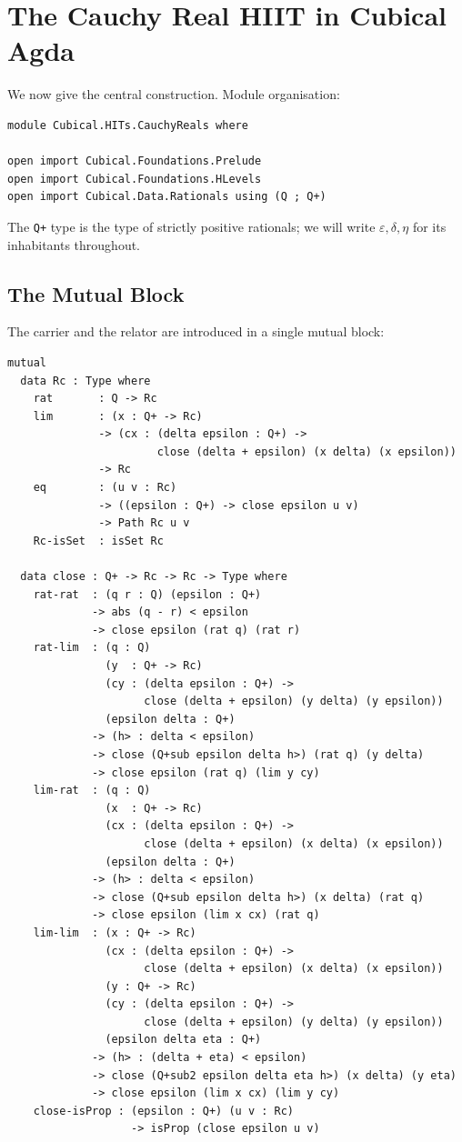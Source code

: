 \documentclass[12pt]{article}
\theoremstyle{definition}
\theoremstyle{remark}
\begin{document}
\section{The Cauchy Real HIIT in Cubical Agda}
\label{sec:cubical-cauchy}

We now give the central construction. Module organisation:
\begin{lstlisting}
module Cubical.HITs.CauchyReals where

open import Cubical.Foundations.Prelude
open import Cubical.Foundations.HLevels
open import Cubical.Data.Rationals using (Q ; Q+)
\end{lstlisting}

The \texttt{Q+} type is the type of strictly positive rationals; we will
write $\varepsilon, \delta, \eta$ for its inhabitants throughout.

\subsection{The Mutual Block}

The carrier and the relator are introduced in a single mutual block:

\begin{lstlisting}
mutual
  data Rc : Type where
    rat       : Q -> Rc
    lim       : (x : Q+ -> Rc)
              -> (cx : (delta epsilon : Q+) ->
                       close (delta + epsilon) (x delta) (x epsilon))
              -> Rc
    eq        : (u v : Rc)
              -> ((epsilon : Q+) -> close epsilon u v)
              -> Path Rc u v
    Rc-isSet  : isSet Rc

  data close : Q+ -> Rc -> Rc -> Type where
    rat-rat  : (q r : Q) (epsilon : Q+)
             -> abs (q - r) < epsilon
             -> close epsilon (rat q) (rat r)
    rat-lim  : (q : Q)
               (y  : Q+ -> Rc)
               (cy : (delta epsilon : Q+) ->
                     close (delta + epsilon) (y delta) (y epsilon))
               (epsilon delta : Q+)
             -> (h> : delta < epsilon)
             -> close (Q+sub epsilon delta h>) (rat q) (y delta)
             -> close epsilon (rat q) (lim y cy)
    lim-rat  : (q : Q)
               (x  : Q+ -> Rc)
               (cx : (delta epsilon : Q+) ->
                     close (delta + epsilon) (x delta) (x epsilon))
               (epsilon delta : Q+)
             -> (h> : delta < epsilon)
             -> close (Q+sub epsilon delta h>) (x delta) (rat q)
             -> close epsilon (lim x cx) (rat q)
    lim-lim  : (x : Q+ -> Rc)
               (cx : (delta epsilon : Q+) ->
                     close (delta + epsilon) (x delta) (x epsilon))
               (y : Q+ -> Rc)
               (cy : (delta epsilon : Q+) ->
                     close (delta + epsilon) (y delta) (y epsilon))
               (epsilon delta eta : Q+)
             -> (h> : (delta + eta) < epsilon)
             -> close (Q+sub2 epsilon delta eta h>) (x delta) (y eta)
             -> close epsilon (lim x cx) (lim y cy)
    close-isProp : (epsilon : Q+) (u v : Rc)
                   -> isProp (close epsilon u v)
\end{lstlisting}
\end{document}
